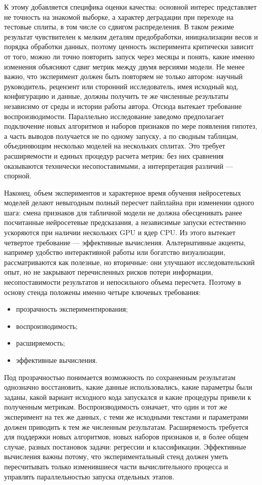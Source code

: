 \documentclass[12pt,a4paper]{article}
\begin{document}
К этому добавляется специфика оценки качества: основной интерес представляет не точность на знакомой выборке, а характер деградации при переходе на тестовые сплиты, в том числе со сдвигом распределения. В таком режиме результат чувствителен к мелким деталям предобработки, инициализации весов и порядка обработки данных, поэтому ценность эксперимента критически зависит от того, можно ли точно повторить запуск через месяцы и понять, какие именно изменения объясняют сдвиг метрик между двумя версиями модели. Не менее важно, что эксперимент должен быть повторяем не только автором: научный руководитель, рецензент или сторонний исследователь, имея исходный код, конфигурацию и данные, должны получить те же численные результаты независимо от среды и истории работы автора. Отсюда вытекает требование воспроизводимости. Параллельно исследование заведомо предполагает подключение новых алгоритмов и наборов признаков по мере появления гипотез, а часть выводов получается не по одному запуску, а по сводным таблицам, объединяющим несколько моделей на нескольких сплитах. Это требует расширяемости и единых процедур расчета метрик: без них сравнения оказываются технически несопоставимыми, а интерпретация различий — спорной.

Наконец, объем экспериментов и характерное время обучения нейросетевых моделей делают невыгодным полный пересчет пайплайна при изменении одного шага: смена признаков для табличной модели не должна обесценивать ранее посчитанные нейросетевые предсказания, а независимые запуски естественно ускоряются при наличии нескольких GPU и ядер CPU. Из этого вытекает четвертое требование — эффективные вычисления. Альтернативные акценты, например удобство интерактивной работы или богатство визуализации, рассматриваются как полезные, но вторичные: они улучшают исследовательский опыт, но не закрывают перечисленных рисков потери информации, несопоставимости результатов и непосильного объема пересчета. Поэтому в основу стенда положены именно четыре ключевых требования:
\begin{itemize}
    \item прозрачность экспериментирования;
    \item воспроизводимость;
    \item расширяемость;
    \item эффективные вычисления.
\end{itemize}

Под прозрачностью понимается возможность по сохраненным результатам однозначно восстановить, какие данные использовались, какие параметры были заданы, какой вариант исходного кода запускался и какие процедуры привели к полученным метрикам. Воспроизводимость означает, что один и тот же эксперимент на тех же данных, с теми же исходными текстами и параметрами должен приводить к тем же численным результатам. Расширяемость требуется для поддержки новых алгоритмов, новых наборов признаков и, в более общем случае, разных постановок задачи: регрессии и классификации. Эффективные вычисления важны потому, что экспериментальный стенд должен уметь пересчитывать только изменившиеся части вычислительного процесса и управлять параллельностью запуска отдельных этапов.
\end{document}
